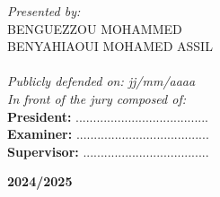 \begin{spacing}{1.5}
\noindent
\textit{Presented by:} \\
BENGUEZZOU MOHAMMED \\
BENYAHIAOUI MOHAMED ASSIL\\
~~\\
\textit{Publicly defended on: jj/mm/aaaa} \\
\textit{In front of the jury composed of:} \\
\textbf{President:} ...................................... \\
\textbf{Examiner:} ...................................... \\
\textbf{Supervisor:} .................................... \\
\centerline{\textbf{2024/2025}}

\end{spacing}



